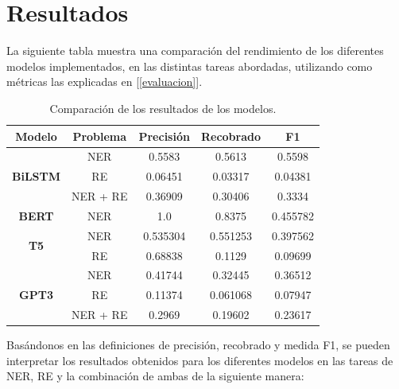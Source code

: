 \documentclass[10pt]{article} %
\begin{document}
	\section{Resultados}
	
	La siguiente tabla muestra una comparaci\'on del rendimiento de los diferentes modelos implementados, en las distintas tareas abordadas, utilizando como m\'etricas las explicadas en [\ref{evaluacion}].
	\begin{table}[htb]
		\centering
		\begin{tabular}{|c|c|c|c|c|}
			\hline
			\textbf{Modelo} & \textbf{Problema} & \textbf{Precisi\'on} & \textbf{Recobrado} & \textbf{F1} \\
			\hline
			\multirow{3}{*}{\textbf{BiLSTM}} & NER & 0.5583 & 0.5613 & 0.5598 \\
			\cline{2-5}
			& RE & 0.06451 & 0.03317 & 0.04381 \\
			\cline{2-5}
			& NER + RE & 0.36909 & 0.30406 & 0.3334 \\
			\hline
		\textbf{BERT} & NER & 1.0 & 0.8375 & 0.455782 \\
			\hline
			\multirow{2}{*}{\textbf{T5}} & NER & 0.535304 & 0.551253 & 0.397562 \\
			\cline{2-5}
			& RE & 0.68838 & 0.1129 & 0.09699 \\
			\hline
			\multirow{3}{*}{\textbf{GPT3}} & NER & 0.41744 & 0.32445 & 0.36512 \\
			\cline{2-5}
			& RE & 0.11374 & 0.061068 & 0.07947 \\
			\cline{2-5}
			& NER + RE & 0.2969 & 0.19602 & 0.23617 \\
			\hline
		
			
		\end{tabular}
		\caption{Comparaci\'on de los resultados de los modelos.}
		\label{resultados}
	\end{table}

	Basándonos en las definiciones de precisión, recobrado y medida F1, se pueden interpretar los resultados obtenidos para los diferentes modelos en las tareas de NER, RE y la combinación de ambas de la siguiente manera:
	
\end{document}
